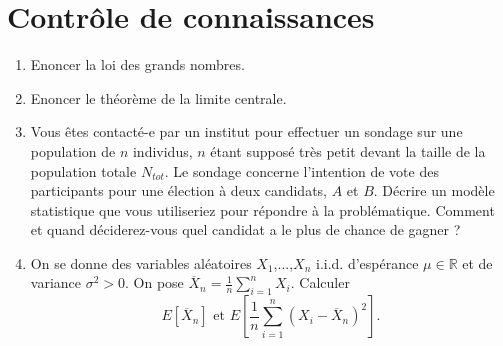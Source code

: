 \section*{Contrôle de connaissances}

\begin{enumerate}
\item Enoncer la loi des grands nombres.
\item Enoncer le théorème de la limite centrale.
\item Vous êtes contacté-e par un institut pour effectuer un sondage sur une population de $n$ individus, $n$ étant supposé très petit devant la taille de la population totale $N_{tot}$. Le sondage concerne l'intention de vote des participants pour une élection à deux candidats, $A$ et $B$. Décrire un modèle statistique que vous utiliseriez pour répondre à la problématique. Comment et quand déciderez-vous quel candidat a le plus de chance de gagner ?
\item On se donne des variables aléatoires $X_1$,...,$X_n$ i.i.d. d'espérance $\mu\in\mathbb R$ et de variance $\sigma^2>0$. On pose $\overline X_n = \frac{1}{n}\sum_{i=1}^n X_i$. Calculer 
\[E[\overline X_n]\text{ et } E[\frac{1}{n}\sum_{i=1}^n (X_i-\overline X_n)^2].\]
\end{enumerate}